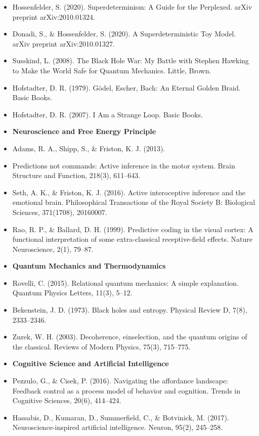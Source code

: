 \documentclass[american,11pt,letterpaper]{article}
\begin{document}
\begin{itemize}
\item Hossenfelder, S. (2020). Superdeterminism: A Guide for the Perplexed. arXiv preprint arXiv:2010.01324.
\item Donadi, S., \& Hossenfelder, S. (2020). A Superdeterministic Toy Model. arXiv preprint arXiv:2010.01327.
\item Susskind, L. (2008). The Black Hole War: My Battle with Stephen Hawking to Make the World Safe for Quantum Mechanics. Little, Brown.
\item Hofstadter, D. R. (1979). G\"odel, Escher, Bach: An Eternal Golden Braid. Basic Books.
\item Hofstadter, D. R. (2007). I Am a Strange Loop. Basic Books.

\item[] \textbf{Neuroscience and Free Energy Principle}
\item Adams, R. A., Shipp, S., \& Friston, K. J. (2013). 
\item Predictions not commands: Active inference in the motor system. Brain Structure and Function, 218(3), 611--643.
\item Seth, A. K., \& Friston, K. J. (2016). Active interoceptive inference and the emotional brain. Philosophical Transactions of the Royal Society B: Biological Sciences, 371(1708), 20160007.
\item Rao, R. P., \& Ballard, D. H. (1999). Predictive coding in the visual cortex: A functional interpretation of some extra-classical receptive-field effects. Nature Neuroscience, 2(1), 79--87.
\item[] \textbf{Quantum Mechanics and Thermodynamics}
\item Rovelli, C. (2015). Relational quantum mechanics: A simple explanation. Quantum Physics Letters, 11(3), 5--12.
\item Bekenstein, J. D. (1973). Black holes and entropy. Physical Review D, 7(8), 2333--2346.
\item Zurek, W. H. (2003). Decoherence, einselection, and the quantum origins of the classical. Reviews of Modern Physics, 75(3), 715--775.
\item[] \textbf{Cognitive Science and Artificial Intelligence}
\item Pezzulo, G., \& Cisek, P. (2016). Navigating the affordance landscape: Feedback control as a process model of behavior and cognition. Trends in Cognitive Sciences, 20(6), 414--424.
\item Hassabis, D., Kumaran, D., Summerfield, C., \& Botvinick, M. (2017). Neuroscience-inspired artificial intelligence. Neuron, 95(2), 245--258.

\end{itemize}
\end{document}
